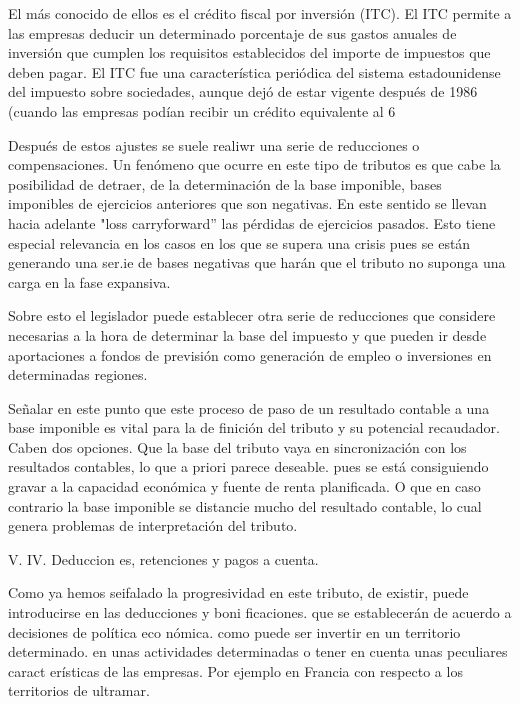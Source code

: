 \documentclass[10pt,a4paper]{article}
\begin{document}
El más conocido de ellos es el crédito fiscal por inversión (ITC). El ITC permite a las empresas deducir un determinado porcentaje de sus gastos anuales de inversión que cumplen los requisitos establecidos del importe de impuestos que deben pagar. El ITC fue una característica periódica del sistema estadounidense del impuesto sobre sociedades, aunque dejó de estar vigente después de 1986 (cuando las empresas podían recibir un crédito equivalente al 6 %



Después de estos ajustes se suele realiwr una serie de reducciones o compensaciones. Un fenómeno que ocurre en este tipo de tributos es que cabe la posibilidad de detraer, de la determinación de la base imponible, bases imponibles de ejercicios anteriores que son negativas. En este sentido se llevan hacia adelante "loss carryforward'' las pérdidas de ejercicios pasados. Esto tiene especial relevancia en los casos en los que se supera una crisis pues se están generando una ser.ie de bases negativas que harán que el tributo no suponga una carga en la fase expansiva. 



Sobre esto el legislador puede establecer otra serie de reducciones que considere necesarias a la hora de determinar la base del impuesto y que pueden ir desde aportaciones a fondos de previsión como generación de empleo o inversiones en determinadas regiones.

Señalar en este punto que este proceso de paso de un resultado contable a una base imponible es vital para la de finición del tributo y su potencial recaudador. Caben dos opciones. Que la base del tributo vaya en sincronización con los resultados contables, lo que a priori parece deseable. pues se está consiguiendo gravar a la capacidad económica y fuente de renta planificada. O que en caso contrario la base imponible se distancie mucho del resultado contable, lo cual genera problemas de interpretación del tributo.

V. IV. Deduccion es, retenciones y pagos a cuenta.

Como ya hemos seifalado la progresividad en este tributo, de existir, puede introducirse en las deducciones y boni ficaciones. que se establecerán de acuerdo a decisiones de política eco nómica. como puede ser invertir en un territorio determinado. en unas actividades determinadas o tener en cuenta unas peculiares caract erísticas de las empresas. Por ejemplo en Francia con respecto a los territorios de ultramar.
\end{document}
